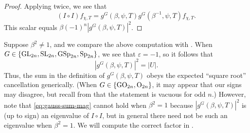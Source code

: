 \begin{proof}
	Applying  twice, we see that
	\[(I\circ I)f_{\chi,T}=g^G(\beta,\psi,T)g^G\left(\beta^{-1},\psi,T\right)f_{\chi,T}.\]
    This scalar equals $\beta(-1)^n\left|g^G(\beta,\psi,T)\right|^2$.
\end{proof}
\begin{remark}
	Suppose $\beta^2\ne1$, and we compare the above computation with . When $G\in\{\mathrm{GL}_{2n},\mathrm{SL}_{2n},\mathrm{GSp}_{2n},\mathrm{Sp}_{2n}\}$, we see that $\varepsilon=-1$, so it follows that
	\begin{equation}
		\left|g^G(\beta,\psi,T)\right|^2=\left|U\right|. \label{eq:gauss-sum-mag}
	\end{equation}
	Thus, the sum in the definition of $g^G(\beta,\psi,T)$ obeys the expected ``square root'' cancellation generically. (When $G\in\{\mathrm{GO}_{2n},\mathrm{O}_{2n}\}$, it may appear that our signs may disagree, but recall from  that the statement is vacuous for odd $n$.)
    However, note that \eqref{eq:gauss-sum-mag} cannot hold when $\beta^2=1$ because $\left|g^G(\beta,\psi,T)\right|^2$ is (up to sign) an eigenvalue of $I\circ I$, but in general there need not be such an eigenvalue when $\beta^2=1$. We will compute the correct factor in .
\end{remark}
